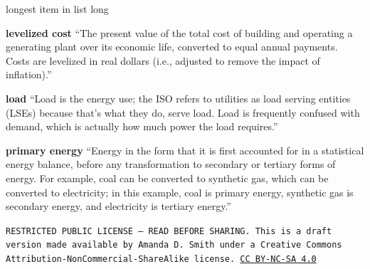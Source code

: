 \documentclass[10pt]{article}
\begin{document}
\begin{labeling}{longest item in list long}
\item [\textbf{levelized cost}] ``The present value of the total cost of building and operating a generating plant over its economic life, converted to equal annual payments. Costs are levelized in real dollars (i.e., adjusted to remove the impact of inflation).'' \cite{EIAglossary}

\item [\textbf{load}] ``Load is the energy use; the ISO refers to utilities as load serving entities (LSEs) because that's what they do, serve load. Load is frequently confused with demand, which is actually how much power the load requires.'' \cite{understandingelectricity}

\item [\textbf{primary energy}] ``Energy in the form that it is first accounted for in a statistical energy balance, before any transformation to secondary or tertiary forms of energy. For example, coal can be converted to synthetic gas, which can be converted to electricity; in this example, coal is primary energy, synthetic gas is secondary energy, and electricity is tertiary energy.'' \cite{EIAglossary}



\end{labeling}



\bigskip

\noindent
\texttt{\footnotesize RESTRICTED PUBLIC LICENSE --- READ BEFORE SHARING. This is a draft version made available by Amanda D. Smith under a Creative Commons Attribution-NonCommercial-ShareAlike license. 
\href{https://creativecommons.org/licenses/by-nc-sa/4.0/}{CC BY-NC-SA 4.0}}


\printbibliography
\end{document}
